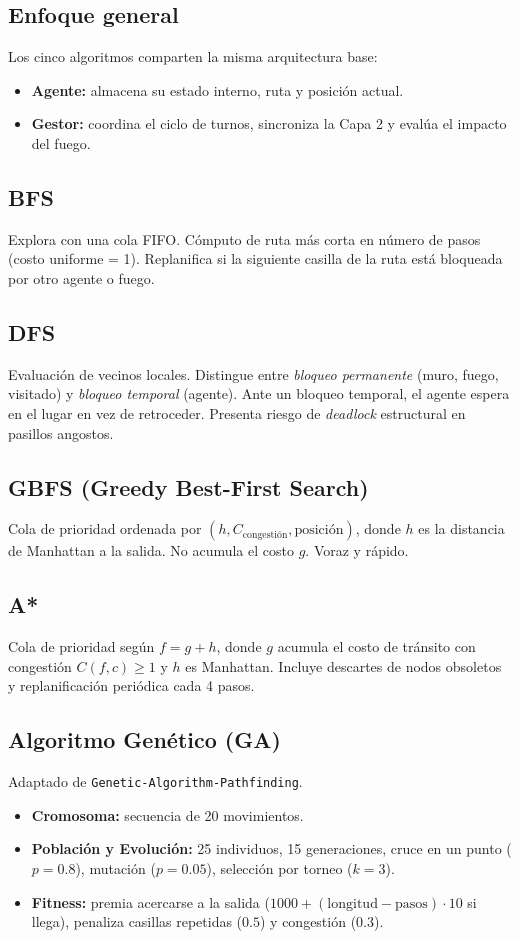 \documentclass[11pt,a4paper]{article}
\begin{document}
\subsection{Enfoque general}
Los cinco algoritmos comparten la misma arquitectura base:
\begin{itemize}
    \item \textbf{Agente:} almacena su estado interno, ruta y posición actual.
    \item \textbf{Gestor:} coordina el ciclo de turnos, sincroniza la Capa 2 y evalúa el impacto del fuego.
\end{itemize}

\subsection{BFS}
Explora con una cola FIFO. Cómputo de ruta más corta en número de pasos (costo uniforme = 1). Replanifica si la siguiente casilla de la ruta está bloqueada por otro agente o fuego.

\subsection{DFS}
Evaluación de vecinos locales. Distingue entre \textit{bloqueo permanente} (muro, fuego, visitado) y \textit{bloqueo temporal} (agente). Ante un bloqueo temporal, el agente espera en el lugar en vez de retroceder. Presenta riesgo de \textit{deadlock} estructural en pasillos angostos.

\subsection{GBFS (Greedy Best-First Search)}
Cola de prioridad ordenada por $(h, C_{\text{congestión}}, \text{posición})$, donde $h$ es la distancia de Manhattan a la salida. No acumula el costo $g$. Voraz y rápido.

\subsection{A*}
Cola de prioridad según $f = g + h$, donde $g$ acumula el costo de tránsito con congestión $C(f,c) \ge 1$ y $h$ es Manhattan. Incluye descartes de nodos obsoletos y replanificación periódica cada 4 pasos.

\subsection{Algoritmo Genético (GA)}
Adaptado de \texttt{Genetic-Algorithm-Pathfinding}.
\begin{itemize}
    \item \textbf{Cromosoma:} secuencia de 20 movimientos.
    \item \textbf{Población y Evolución:} 25 individuos, 15 generaciones, cruce en un punto ($p=0.8$), mutación ($p=0.05$), selección por torneo ($k=3$).
    \item \textbf{Fitness:} premia acercarse a la salida ($1000 + (\text{longitud} - \text{pasos}) \cdot 10$ si llega), penaliza casillas repetidas ($0.5$) y congestión ($0.3$).
\end{itemize}
\end{document}
